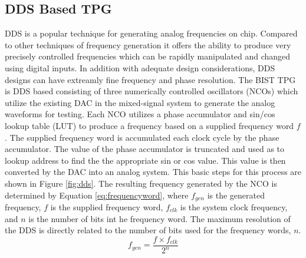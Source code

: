 \documentclass[12pt]{report}
\begin{document}
\subsection{DDS Based TPG}
DDS is a popular technique for generating analog frequencies on chip.  Compared to other techniques of frequency generation it offers the ability to produce very precisely controlled frequencies which can be rapidly manipulated and changed using digital inputs.  In addition with adequate design considerations, DDS designs can have extreamly fine frequency and phase resolution\cite{qi}.  The BIST TPG is DDS based consisting of three numerically controlled oscillators (NCOs) which utilize the existing DAC in the mixed-signal system to generate the analog waveforms for testing\cite{testtime}.  Each NCO utilizes a phase accumulator and sin/cos lookup table (LUT) to produce a frequency based on a supplied frequency word $f$. The supplied frequency word is accumulated each clock cycle by the phase accumulator.  The value of the phase accumulator is truncated and used as to lookup address to find the the appropriate sin or cos value.  This value is then converted by the DAC into an analog system.  This basic steps for this process are shown in Figure \ref{fig:dds}.  The resulting frequency generated by the NCO is determined by Equation \ref{eq:frequencyword}, where $f_{gen}$ is the generated frequency, $f$ is the supplied frequency word, $f_{clk}$ is the system clock frequency, and $n$ is the number of bits int he frequency word.  The maximum resolution of the DDS is directly related to the number of bits used for the frequency words, $n$.
\begin{equation}
	f_{gen} = \frac{f \times f_{clk}}{2^{n}}
	\label{eq:frequencyword}
\end{equation}
\end{document}
